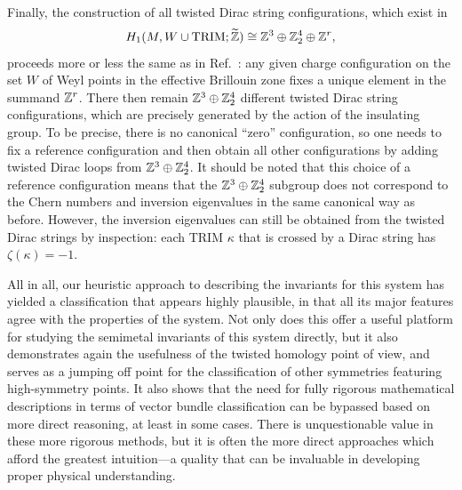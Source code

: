 Finally, the construction of all twisted Dirac string configurations, which exist in
\begin{equation*}
	H_1(M, W\cup\text{TRIM};\widetilde{\mathbb{Z}}) \cong \mathbb{Z}^3\oplus\mathbb{Z}_2^4\oplus\mathbb{Z}^r,
\end{equation*}
proceeds more or less the same as in Ref.~\cite{Mathai_math-review}: any given charge configuration on the set $W$ of Weyl points in the effective Brillouin zone fixes a unique element in the summand $\mathbb{Z}^r$. There then remain $\mathbb{Z}^3\oplus\mathbb{Z}_2^4$ different twisted Dirac string configurations, which are precisely generated by the action of the insulating group. To be precise, there is no canonical ``zero'' configuration, so one needs to fix a reference configuration and then obtain all other configurations by adding twisted Dirac loops from $\mathbb{Z}^3\oplus\mathbb{Z}_2^4$. It should be noted that this choice of a reference configuration means that the $\mathbb{Z}^3\oplus\mathbb{Z}_2^4$ subgroup does not correspond to the Chern numbers and inversion eigenvalues in the same canonical way as before. However, the inversion eigenvalues can still be obtained from the twisted Dirac strings by inspection: each TRIM $\kappa$ that is crossed by a Dirac string has $\zeta(\kappa)=-1$.

All in all, our heuristic approach to describing the invariants for this system has yielded a classification that appears highly plausible, in that all its major features agree with the properties of the system. Not only does this offer a useful platform for studying the semimetal invariants of this system directly, but it also demonstrates again the usefulness of the twisted homology point of view, and serves as a jumping off point for the classification of other symmetries featuring high-symmetry points. It also shows that the need for fully rigorous mathematical descriptions in terms of vector bundle classification can be bypassed based on more direct reasoning, at least in some cases. There is unquestionable value in these more rigorous methods, but it is often the more direct approaches which afford the greatest intuition---a quality that can be invaluable in developing proper physical understanding.